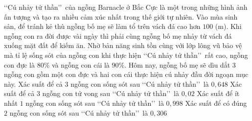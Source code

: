 \begin{ex}%
	\lq\lq Cú nhảy tử thần\rq\rq\ của ngỗng Barnacle ở Bắc Cực là một trong những hình ảnh ấn tượng và tạo ra nhiều cảm xúc nhất trong thế giới tự nhiên. Vào mùa sinh sản, để tránh kẻ thù ngỗng bố mẹ sẽ làm tổ trên vách đá cao hơn $100$ (m). Khi ngỗng con ra đời được vài ngày thì phải cùng ngỗng bố mẹ nhảy từ vách đá xuống mặt đất để kiếm ăn. Nhờ bản năng sinh tồn cùng với lớp lông vũ bảo vệ mà tỉ lệ sống sót của ngỗng con khi thực hiện \lq\lq Cú nhảy tử thần\rq\rq\ rất cao, ngỗng con đực là $80\%$ và ngỗng con cái là $90\%$. Hôm nay, ngỗng bố mẹ sẽ dìu dắt $3$ ngỗng con gồm một con đực và hai con cái thực hiện cú nhảy đầu đời ngoạn mục này.
	\choiceTF
	{\True Xác suất để cả $3$ ngỗng con sống sót sau \lq\lq Cú nhảy tử thần\rq\rq\ là $0{,}648$}
	{Xác suất để cả $3$ ngỗng con tử vong sau \lq\lq Cú nhảy tử thần\rq\rq\ là $0{,}02$}
	{\True Xác suất để ít nhất $1$ ngỗng con sống sót sau \lq\lq Cú nhảy tử thần\rq\rq\ là $0{,}998$}
	{\True Xác suất để có đúng $2$ ngỗng con sống sót sau \lq\lq Cú nhảy tử thần\rq\rq\ là $0{,}306$}
\end{ex}

